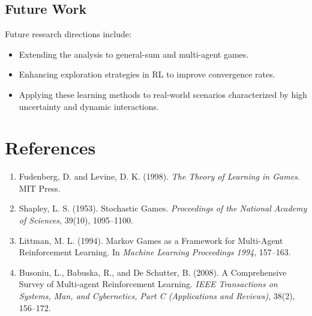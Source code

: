 \documentclass[11pt]{article}
\begin{document}
\subsection*{Future Work}
Future research directions include:
\begin{itemize}
    \item Extending the analysis to general-sum and multi-agent games.
    \item Enhancing exploration strategies in RL to improve convergence rates.
    \item Applying these learning methods to real-world scenarios characterized by high uncertainty and dynamic interactions.
\end{itemize}

\section*{References}
\begin{enumerate}
    \item Fudenberg, D. and Levine, D. K. (1998). \emph{The Theory of Learning in Games}. MIT Press.
    \item Shapley, L. S. (1953). Stochastic Games. \emph{Proceedings of the National Academy of Sciences}, 39(10), 1095--1100.
    \item Littman, M. L. (1994). Markov Games as a Framework for Multi-Agent Reinforcement Learning. In \emph{Machine Learning Proceedings 1994}, 157--163.
    \item Busoniu, L., Babuska, R., and De Schutter, B. (2008). A Comprehensive Survey of Multi-agent Reinforcement Learning. \emph{IEEE Transactions on Systems, Man, and Cybernetics, Part C (Applications and Reviews)}, 38(2), 156--172.
\end{enumerate}
\end{document}
